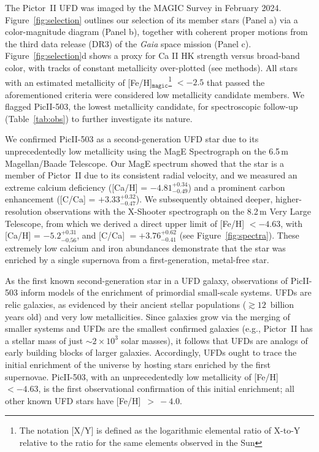 \documentclass[pdflatex,sn-nature]{sn-jnl}%
\theoremstyle{thmstyleone}%
\theoremstyle{thmstyletwo}%
\theoremstyle{thmstylethree}%
\begin{document}
The Pictor~II UFD was imaged by the MAGIC Survey in February 2024. 
Figure~\ref{fig:selection} outlines our selection of its member stars (Panel a) via a color-magnitude diagram (Panel b), together with coherent proper motions from the third data release (DR3) of the \textit{Gaia} space mission (Panel c)\cite{gaia1,gaia2,btt+22}. 
Figure~\ref{fig:selection}d shows a proxy for Ca II HK strength versus broad-band color, with tracks of constant metallicity over-plotted (see methods). 
All stars with an estimated metallicity of [Fe/H]$_{\texttt{magic}}$\footnote{The notation [X/Y] is defined as the logarithmic elemental ratio of X-to-Y relative to the ratio for the same elements observed in the Sun} $< -2.5$ that passed the aforementioned criteria were considered low metallicity candidate members. 
We flagged PicII-503, the lowest metallicity candidate, for spectroscopic follow-up (Table~\ref{tab:obs}) to further investigate its nature.

We confirmed PicII-503 as a second-generation UFD star due to its unprecedentedly low metallicity using the MagE Spectrograph\cite{mbt+08} on the 6.5\,m Magellan/Baade Telescope. 
Our MagE spectrum showed that the star is a member of Pictor~II due to its consistent radial velocity\cite{pace+25}, and we measured an extreme calcium deficiency ([Ca/H] = $-4.81^{+0.34}_{-0.49}$) and a prominent carbon enhancement ([C/Ca] = $+3.33^{+0.32}_{-0.47}$). 
We subsequently obtained deeper, higher-resolution observations with the X-Shooter spectrograph on the 8.2\,m Very Large Telescope\cite{vdd+11}, from which we derived a direct upper limit of [Fe/H] $< -4.63$, with [Ca/H] = $-5.2^{+0.31}_{-0.56}$, and [C/Ca] $= +3.76^{+0.62}_{-0.41}$ (see Figure~\ref{fig:spectra}).
These extremely low calcium and iron abundances demonstrate that the star was enriched by a single supernova from a first-generation, metal-free star\cite{cds+04, hw+10}.

As the first known second-generation star in a UFD galaxy, observations of PicII-503 inform models of the enrichment of primordial small-scale systems. 
UFDs are relic galaxies, as evidenced by their ancient stellar populations ($\gtrsim12$\, billion years old)\cite{brown+14} and very low metallicities\cite{sg+07}.
Since galaxies grow via the merging of smaller systems\cite{sz+78} and UFDs are the smallest confirmed galaxies\cite{s+19} (e.g., Pictor~II has a stellar mass of just $\sim2\times10^3$ solar masses\cite{pace+25}), it follows that UFDs are analogs of early building blocks of larger galaxies.
Accordingly, UFDs ought to trace the initial enrichment of the universe by hosting stars enriched by the first supernovae.
PicII-503, with an unprecedentedly low metallicity of [Fe/H] $< -4.63$, is the first observational confirmation of this initial enrichment; all other known UFD stars have [Fe/H]~$>~-4.0$\cite{bcf+25}.  
\end{document}
